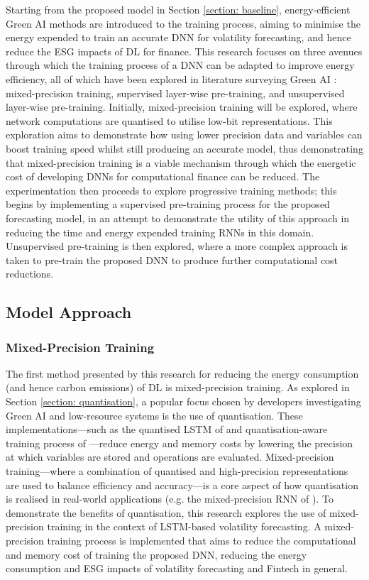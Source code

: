 \documentclass[a4paper, 11pt]{report}
\begin{document}
    Starting from the proposed model in Section \ref{section: baseline}, energy-efficient Green AI methods are introduced to the training process, aiming to minimise the energy expended to train an accurate DNN for volatility forecasting, and hence reduce the ESG impacts of DL for finance. This research focuses on three avenues through which the training process of a DNN can be adapted to improve energy efficiency, all of which have been explored in literature surveying Green AI \citep{xu-2021}: mixed-precision training, supervised layer-wise pre-training, and unsupervised layer-wise pre-training. Initially, mixed-precision training will be explored, where network computations are quantised to utilise low-bit representations. This exploration aims to demonstrate how using lower precision data and variables can boost training speed whilst still producing an accurate model, thus demonstrating that mixed-precision training is a viable mechanism through which the energetic cost of developing DNNs for computational finance can be reduced. The experimentation then proceeds to explore progressive training methods; this begins by implementing a supervised pre-training process for the proposed forecasting model, in an attempt to demonstrate the utility of this approach in reducing the time and energy expended training RNNs in this domain. Unsupervised pre-training is then explored, where a more complex approach is taken to pre-train the proposed DNN to produce further computational cost reductions.


    \subsection{Model Approach}

    \subsubsection{Mixed-Precision Training}

    The first method presented by this research for reducing the energy consumption (and hence carbon emissions) of DL is mixed-precision training. As explored in Section \ref{section: quantisation}, a popular focus chosen by developers investigating Green AI and low-resource systems is the use of quantisation. These implementations---such as the quantised LSTM of \citet{he-2016} and quantisation-aware training process of \citet{fan-2020b}---reduce energy and memory costs by lowering the precision at which variables are stored and operations are evaluated. Mixed-precision training---where a combination of quantised and high-precision representations are used to balance efficiency and accuracy---is a core aspect of how quantisation is realised in real-world applications (e.g. the mixed-precision RNN of \citet{ott-2017}). To demonstrate the benefits of quantisation, this research explores the use of mixed-precision training in the context of LSTM-based volatility forecasting. A mixed-precision training process is implemented that aims to reduce the computational and memory cost of training the proposed DNN, reducing the energy consumption and ESG impacts of volatility forecasting and Fintech in general.
\end{document}
